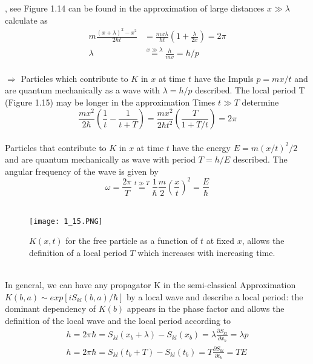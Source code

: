 , see Figure 1.14 can be found in the approximation of large distances $x\gg \lambda$
calculate as
\\
\begin{equation}
\begin{aligned} m \frac{(x+\lambda)^{2}-x^{2}}{2 \hbar t} &=\frac{m x \lambda}{\hbar t}\left(1+\frac{\lambda}{2 x}\right)=2 \pi \\ \lambda & \stackrel{x \gg \lambda}{=} \frac{h}{m v}=h / p \end{aligned}
\end{equation}\\
$\Rightarrow$ Particles which contribute to $K$ in $x$ at time $t$ have the
Impuls $p = mx / t$ and are quantum mechanically as a wave with $\lambda = h/p$
described.
The local period T (Figure 1.15) may be longer in the approximation
Times $t\gg T$ determine
\\
\begin{equation}
\frac{m x^{2}}{2 \hbar}\left(\frac{1}{t}-\frac{1}{t+T}\right)=\frac{m x^{2}}{2 \hbar t^{2}}\left(\frac{T}{1+T / t}\right)=2 \pi
\end{equation}\\
Particles that contribute to $K$ in $x$ at time $t$ have the energy $E = m (x / t)^2 / 2$ and are quantum mechanically as wave with period $T = h / E$ described. The angular frequency of the wave is given by
\\
\begin{equation}
\omega=\frac{2 \pi}{T} \stackrel{t \gg T}{=} \frac{1}{\hbar} \frac{m}{2}\left(\frac{x}{t}\right)^{2}=\frac{E}{\hbar}
\end{equation}\\
\begin{figure}[ht]
    \centering
    \texttt{[image: 1\_15.PNG]}
    \caption{$K (x, t)$ for the free particle as a function of $t$ at fixed $x$, allows the definition of a local period $T$ which increases with increasing time.}
    \label{fig:1.15}
\end{figure}
\\
In general, we can have any propagator K in the semi-classical
Approximation $K (b, a) \sim exp [iS_{kl}(b, a)/\hbar]$ by a local wave and
describe a local period: the dominant dependency of $K (b)$
appears in the phase factor and allows the definition of the local wave
and the local period according to
\\
\begin{equation}
\begin{array}{l}{h=2 \pi \hbar=S_{k l}\left(x_{b}+\lambda\right)-S_{k l}\left(x_{b}\right)=\lambda \frac{\partial S_{k l}}{\partial x_{b}}=\lambda p} \\ {h=2 \pi \hbar=S_{k l}\left(t_{b}+T\right)-S_{k l}\left(t_{b}\right)=T \frac{\partial S_{k l}}{\partial t_{b}}=T E}\end{array}
\end{equation}\\
